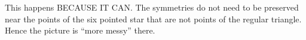 \documentclass[noauthor,nooutcomes,12pt,hints,handout]{ximera}
\begin{document}
\begin{question}
\begin{freeResponse}
\begin{enumerate}
    This happens BECAUSE IT CAN. The symmetries do not need to be
    preserved near the points of the six pointed star that are not
    points of the regular triangle. Hence the picture is ``more
    messy'' there.
  \end{enumerate}
\end{freeResponse}


\end{question}
\end{document}
